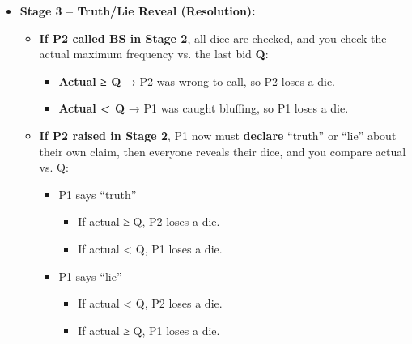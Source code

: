 \documentclass[
]{article}
\begin{document}
\begin{itemize}
  \begin{itemize}
  \item
    Once P1 announces ``Max-frequency ≥ Q,'' P2 has two choices:

    \begin{itemize}
    \item
      \textbf{Raise:} Increase the bid to \textbf{Q′ \textgreater{} Q},
      forcing P1 back on the defensive.
    \item
      \textbf{Call BS:} Challenge P1's claim immediately.
    \end{itemize}
  \item
    If P2's hand already contains close to Q of some face, then
    ``Max-frequency ≥ Q'' is quite plausible, and P2 is likelier to
    raise (or even pass by raising minimally). If P2's hand makes Q seem
    out of reach, you can call a bluff. It can be summarized as follows:
    ``Given my dice, how likely is it that some face reaches Q across
    both hands?''
  \end{itemize}
\item
  \textbf{Stage 3 -- Truth/Lie Reveal (Resolution):}

  \begin{itemize}
  \item
    \textbf{If P2 called BS in Stage 2}, all dice are checked, and you
    check the actual maximum frequency vs. the last bid \textbf{Q}:

    \begin{itemize}
    \item
      \textbf{Actual ≥ Q} → P2 was wrong to call, so P2 loses a die.
    \item
      \textbf{Actual \textless{} Q} → P1 was caught bluffing, so P1
      loses a die.
    \end{itemize}
  \item
    \textbf{If P2 raised in Stage 2}, P1 now must \textbf{declare}
    ``truth'' or ``lie'' about their own claim, then everyone reveals
    their dice, and you compare actual vs. Q:

    \begin{itemize}
    \item
      P1 says ``truth''

      \begin{itemize}
      \item
        If actual ≥ Q, P2 loses a die.
      \item
        If actual \textless{} Q, P1 loses a die.
      \end{itemize}
    \item
      P1 says ``lie''

      \begin{itemize}
      \item
        If actual \textless{} Q, P2 loses a die.
      \item
        If actual ≥ Q, P1 loses a die.
      \end{itemize}
    \end{itemize}
  \end{itemize}
\end{itemize}
\end{document}
